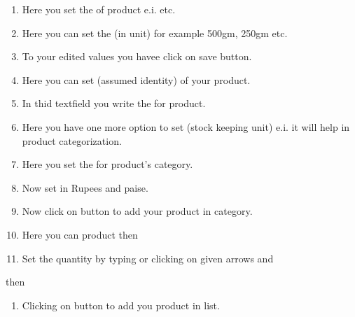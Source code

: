 \documentclass[a4paper,10pt,english]{report}
\begin{document}
\begin{description}
\begin{enumerate}
\item {} 
Here you set the  of product e.i.  etc.

\item {} 
Here you can set the  (in unit) for example 500gm, 250gm etc.

\item {} 
To  your edited values you havee click on save button.

\item {} 
Here you can set  (assumed identity) of your product.

\item {} 
In thid textfield you write the  for product.

\item {} 
Here you have one more option to set  (stock keeping unit) e.i.  it will help in product categorization.

\item {} 
Here you set the  for product’s category.

\item {} 
Now set  in Rupees and paise.

\item {} 
Now click on  button to add your product in category.

\item {} 
Here you can  product then

\item {} 
Set the quantity by typing or clicking on given arrows and

\end{enumerate}

\end{description}

then
\begin{enumerate}
\def\theenumi{\arabic{enumi}}
\def\labelenumi{\theenumi .}
\makeatletter\def\p@enumii{\p@enumi \theenumi .}\makeatother
\setcounter{enumi}{22}
\item {} 
Clicking on  button to add you product in list.

\end{enumerate}
\end{document}
